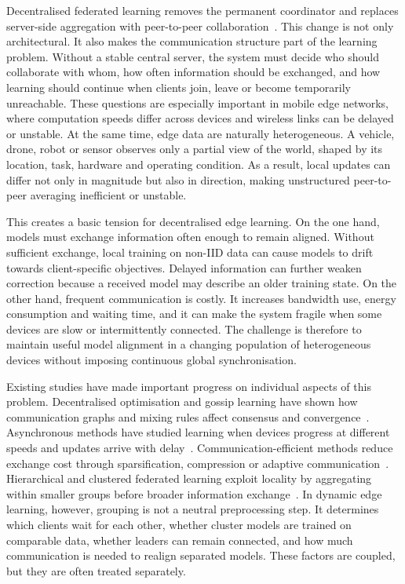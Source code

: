 \documentclass[pdflatex,sn-mathphys-num]{sn-jnl}
\begin{document}
Decentralised federated learning removes the permanent coordinator and replaces server-side aggregation with peer-to-peer collaboration~\cite{lian2017can,yuan2024decentralized}. This change is not only architectural. It also makes the communication structure part of the learning problem. Without a stable central server, the system must decide who should collaborate with whom, how often information should be exchanged, and how learning should continue when clients join, leave or become temporarily unreachable. These questions are especially important in mobile edge networks, where computation speeds differ across devices and wireless links can be delayed or unstable. At the same time, edge data are naturally heterogeneous. A vehicle, drone, robot or sensor observes only a partial view of the world, shaped by its location, task, hardware and operating condition. As a result, local updates can differ not only in magnitude but also in direction, making unstructured peer-to-peer averaging inefficient or unstable.

This creates a basic tension for decentralised edge learning. On the one hand, models must exchange information often enough to remain aligned. Without sufficient exchange, local training on non-IID data can cause models to drift towards client-specific objectives. Delayed information can further weaken correction because a received model may describe an older training state. On the other hand, frequent communication is costly. It increases bandwidth use, energy consumption and waiting time, and it can make the system fragile when some devices are slow or intermittently connected. The challenge is therefore to maintain useful model alignment in a changing population of heterogeneous devices without imposing continuous global synchronisation.

Existing studies have made important progress on individual aspects of this problem. Decentralised optimisation and gossip learning have shown how communication graphs and mixing rules affect consensus and convergence~\cite{lian2017can,koloskova2020unified,boyd2006randomized,nedic2018network}. Asynchronous methods have studied learning when devices progress at different speeds and updates arrive with delay~\cite{lian2018asynchronous,assran2019stochastic}. Communication-efficient methods reduce exchange cost through sparsification, compression or adaptive communication~\cite{wang2019matcha,koloskova2020decentralized,tang2020communication}. Hierarchical and clustered federated learning exploit locality by aggregating within smaller groups before broader information exchange~\cite{castiglia2021multi,ghosh2020efficient,lin2021semi,tang2025adaptive}. In dynamic edge learning, however, grouping is not a neutral preprocessing step. It determines which clients wait for each other, whether cluster models are trained on comparable data, whether leaders can remain connected, and how much communication is needed to realign separated models. These factors are coupled, but they are often treated separately.
\end{document}
